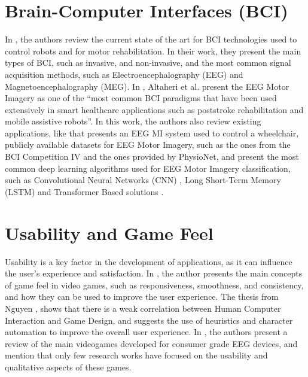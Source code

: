 \section{Brain-Computer Interfaces (BCI)}
In \cite{robinson2021emerging}, the authors review the current state of the art for BCI technologies used to control robots and for motor rehabilitation.
In their work, they present the main types of BCI, such as invasive, and non-invasive, and the most common signal acquisition methods, such as Electroencephalography (EEG) and Magnetoencephalography (MEG).
In \cite{altaheri_deep_2023}, Altaheri et al. present the EEG Motor Imagery as one of the ``most common BCI paradigms that have been used extensively in smart healthcare applications such as poststroke rehabilitation and mobile assistive robots''.
In this work, the authors also review existing applications, like \cite{tang2020motor} that presents an EEG MI system used to control a wheelchair, publicly available datasets for EEG Motor Imagery, such as the ones from the BCI Competition IV and the ones provided by PhysioNet\cite{goldberger2000physiobank, schalk2004bci2000}, and present the most common deep learning algorithms used for EEG Motor Imagery classification, such as Convolutional Neural Networks (CNN) \cite{lawhern2018eegnet}, Long Short-Term Memory (LSTM) and Transformer Based solutions \cite{sharma_deep_2023}.

\section{Usability and Game Feel}
Usability is a key factor in the development of applications, as it can influence the user's experience and satisfaction.
In \cite{swink2008game}, the author presents the main concepts of game feel in video games, such as responsiveness, smoothness, and consistency, and how they can be used to improve the user experience.
The thesis from Nguyen \cite{nguyen2012human}, shows that there is a weak correlation between Human Computer Interaction and Game Design, and suggests the use of heuristics and character automation to improve the overall user experience.
In \cite{doi:10.1080/10447318.2019.1612213}, the authors present a review of the main videogames developed for consumer grade EEG devices, and mention that only few research works have focused on the usability and qualitative aspects of these games.

